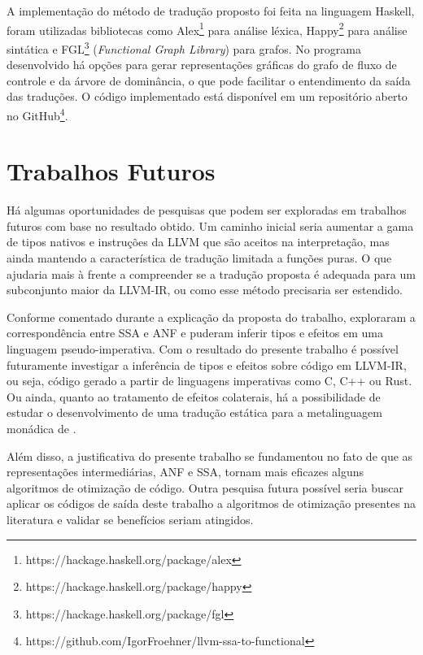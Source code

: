 A implementação do método de tradução proposto foi feita na linguagem Haskell, foram utilizadas bibliotecas como Alex\footnote{https://hackage.haskell.org/package/alex} para análise léxica, Happy\footnote{https://hackage.haskell.org/package/happy} para análise sintática e FGL\footnote{https://hackage.haskell.org/package/fgl} (\emph{Functional Graph Library}) para grafos. No programa desenvolvido há opções para gerar representações gráficas do grafo de fluxo de controle e da árvore de dominância, o que pode facilitar o entendimento da saída das traduções. O código implementado está disponível em um repositório aberto no GitHub\footnote{https://github.com/IgorFroehner/llvm-ssa-to-functional}.

\section{Trabalhos Futuros}

Há algumas oportunidades de pesquisas que podem ser exploradas em trabalhos futuros com base no resultado obtido. Um caminho inicial seria aumentar a gama de tipos nativos e instruções da LLVM que são aceitos na interpretação, mas ainda mantendo a característica de tradução limitada a funções puras. O que ajudaria mais à frente a compreender se a tradução proposta é adequada para um subconjunto maior da LLVM-IR, ou como esse método precisaria ser estendido.

Conforme comentado durante a explicação da proposta do trabalho,  exploraram a correspondência entre SSA e ANF e puderam inferir tipos e efeitos em uma linguagem pseudo-imperativa. Com o resultado do presente trabalho é possível futuramente investigar a inferência de tipos e efeitos sobre código em LLVM-IR, ou seja, código gerado a partir de linguagens imperativas como C, C++ ou Rust. Ou ainda, quanto ao tratamento de efeitos colaterais, há a possibilidade de estudar o desenvolvimento de uma tradução estática para a metalinguagem monádica de .

Além disso, a justificativa do presente trabalho se fundamentou no fato de que as representações intermediárias, ANF e SSA, tornam mais eficazes alguns algoritmos de otimização de código. Outra pesquisa futura possível seria buscar aplicar os códigos de saída deste trabalho a algoritmos de otimização presentes na literatura e validar se benefícios seriam atingidos.
